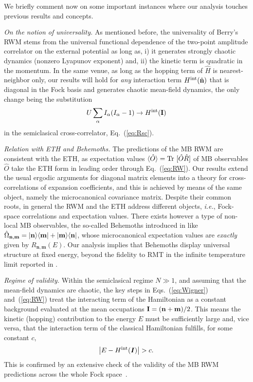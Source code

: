\documentclass[prl,a4paper,twocolumn,superscriptaddress,floatfix]{revtex4-1}%
\begin{document}
We briefly comment now on some important instances where our analysis touches previous results and concepts.

{\it On the notion of universality.} As mentioned before, the universality of Berry's RWM stems from the universal functional dependence of the two-point amplitude correlator on the external potential as long as, i) it generates strongly chaotic dynamics (nonzero Lyapunov exponent) and, ii) the kinetic term is quadratic in the momentum. In the same venue, as long as the hopping term of $\hat{H}$ is nearest-neighbor only, our results will hold for \textit{any} interaction term $H^{\rm int}(\hat{\mathbf n})$ that is diagonal in the Fock basis and generates chaotic mean-field dynamics, the only change being the substitution 
\begin{equation}
U\sum_{\alpha}I_{\alpha}(I_{\alpha}-1) \to H^{\rm int}({\bf I})
\end{equation}
in the semiclasical cross-correlator, Eq.~(\ref{eq:Rsc}).

{\it Relation with ETH and Behemoths.} The predictions of the MB RWM  are consistent with the ETH, as expectation values $\langle \hat{O} \rangle ={\rm Tr~}[\hat{O}\hat{R}]$ of MB observables $\hat{O}$ take the ETH form in leading order through Eq.~(\ref{eq:RW}). Our results extend the usual ergodic arguments for diagonal matrix elements into a theory for cross-correlations of expansion coefficients, and this is achieved by means of the same object, namely the microcanonical covariance matrix. Despite their common roots, in general the RWM and the ETH address different objects, {\em i.e.}, Fock-space correlations and expectation values. There exists however a type of non-local MB observables, the so-called Behemoths introduced in \cite{Haque2019} like $\hat{\Omega}_{{\bf n},{\bf m}}=|{\bf n}\rangle \langle{\bf m}|+|{\bf m}\rangle \langle{\bf n}|$, whose microcanonical expectation values are {\it exactly} given by $R_{{\mathbf n},{\mathbf m}}(E)$. Our analysis implies that Behemoths display universal structure at fixed energy, beyond the fidelity to RMT in the infinite temperature limit reported in \cite{Haque2019}.

{\it Regime of validity.} Within the semiclasical regime $N\gg 1$, and assuming that the mean-field dynamics are chaotic, the key steps in Eqs.~(\ref{eq:Wigner}) and~(\ref{eq:RW}) treat the interacting term of the Hamiltonian as a constant background evaluated at the mean occupations ${\bf I}= ({\bf n}+{\bf m})/2$. This means the kinetic (hopping) contribution to the energy $E$ must be sufficiently large and, vice versa, 
that the interaction term of the classical Hamiltonian fulfills, for some constant $c$,
\begin{equation}
 \left|E-H^{\rm int}({\boldsymbol I})\right|>c.
\end{equation}
 This is confirmed by an extensive check of the validity of the MB RWM predictions across the whole Fock space~\cite{suppmat}. 
\end{document}
